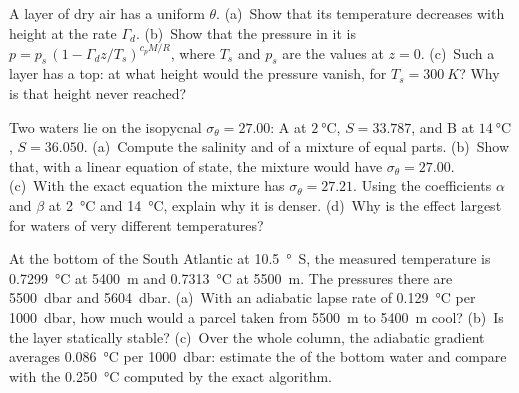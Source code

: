 \begin{exercise}[$\star\star\star$]\label{exo:b1:fluid-envelopes-structure:10}
A layer of dry air has a uniform  $\theta$. (a)~Show that its
temperature decreases with height at the rate $\Gamma_d$. (b)~Show that the
pressure in it is $p = p_s\,(1 - \Gamma_d z/T_s)^{c_pM/R}$, where $T_s$ and $p_s$ are
the values at $z = 0$. (c)~Such a layer has a top: at what height would the
pressure vanish, for $T_s = \qty{300}{K}$? Why is that height never reached?
\end{exercise}

\begin{exercise}[$\star\star\star$]\label{exo:b1:fluid-envelopes-structure:11}
Two waters lie on the isopycnal $\sigma_\theta = 27.00$: A at
$\qty{2}{\celsius}$, $S = 33.787$, and B at $\qty{14}{\celsius}$, $S = 36.050$.
(a)~Compute the salinity and  of a mixture of equal parts.
(b)~Show that, with a linear equation of state, the mixture would have
$\sigma_\theta = 27.00$. (c)~With the exact equation the mixture has
$\sigma_\theta = 27.21$. Using the coefficients $\alpha$ and $\beta$ at \qty{2}{\celsius}
and \qty{14}{\celsius}, explain why it is denser. (d)~Why is the effect largest
for waters of very different temperatures?
\end{exercise}

\begin{exercise}[$\star\star\star$]\label{exo:b1:fluid-envelopes-structure:12}
At the bottom of the South Atlantic at \qty{10.5}{\degree S}, the measured
temperature is \qty{0.7299}{\celsius} at \qty{5400}{m} and \qty{0.7313}{\celsius}
at \qty{5500}{m}. The pressures there are \qty{5500}{dbar} and \qty{5604}{dbar}. (a)~With an
adiabatic lapse rate of \qty{0.129}{\celsius} per \qty{1000}{dbar}, how much
would a parcel taken from \qty{5500}{m} to \qty{5400}{m} cool? (b)~Is the layer
statically stable? (c)~Over the whole column, the adiabatic gradient averages
\qty{0.086}{\celsius} per \qty{1000}{dbar}: estimate the 
of the bottom water and compare with the \qty{0.250}{\celsius} computed by the
exact algorithm.
\end{exercise}

